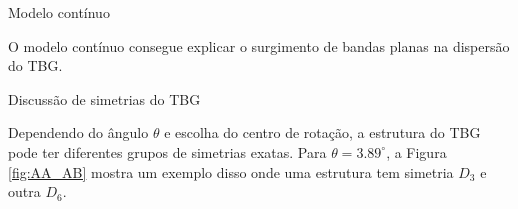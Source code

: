 \documentclass[8pt,aspectratio=169,xcolor={table,dvipsnames,usenames}]{beamer}
\begin{document}

\begin{frame}{Modelo contínuo}

O modelo contínuo consegue explicar o surgimento de bandas planas na dispersão do TBG.

\begin{center}
\end{center}

\end{frame}



\begin{frame}{Discussão de simetrias do TBG}

Dependendo do ângulo $\theta$ e escolha do centro de rotação, a estrutura do TBG pode ter diferentes grupos de simetrias exatas. Para $\theta = 3.89^\circ$, a Figura \ref{fig:AA_AB} mostra um exemplo disso onde uma estrutura tem simetria $D_3$ e outra $D_6$.


\end{frame}
\end{document}
